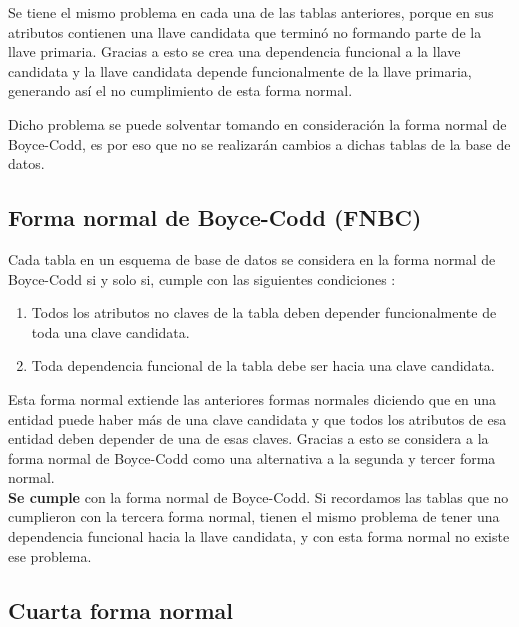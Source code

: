     \noindent Se tiene el mismo problema en cada una de las tablas anteriores, porque en sus atributos contienen una llave candidata que terminó no formando parte de la llave primaria. Gracias a esto se crea una dependencia funcional a la llave candidata y la llave candidata depende funcionalmente de la llave primaria, generando así el no cumplimiento de esta forma normal.
    
    \noindent Dicho problema se puede solventar tomando en consideración la forma normal de Boyce-Codd, es por eso que no se realizarán cambios a dichas tablas de la base de datos.
 
\subsection*{Forma normal de Boyce-Codd (FNBC)}
    
    Cada tabla en un esquema de base de datos se considera en la forma normal de Boyce-Codd si y solo si, cumple con las siguientes condiciones \cite[pág. 168]{libroBaseDeDatosIngles}:
    
    \begin{enumerate}
        \item Todos los atributos no claves de la tabla deben depender funcionalmente de toda una clave candidata.
        \item Toda dependencia funcional de la tabla debe ser hacia una clave candidata.
    \end{enumerate}
    
    \noindent Esta forma normal extiende las anteriores formas normales diciendo que en una entidad puede haber más de una clave candidata y que todos los atributos de esa entidad deben depender de una de esas claves. Gracias a esto se considera a la forma normal de Boyce-Codd como una alternativa a la segunda y tercer forma normal.\\
    
    
    \noindent \textbf{Se cumple} con la forma normal de Boyce-Codd. Si recordamos las tablas que no cumplieron con la tercera forma normal, tienen el mismo problema de tener una dependencia funcional hacia la llave candidata, y con esta forma normal no existe ese problema. \\
    
     
     
    
\clearpage    
\subsection*{Cuarta forma normal}
    
